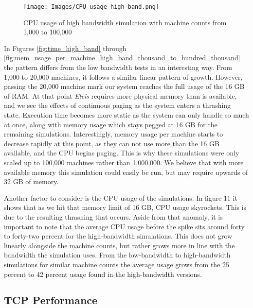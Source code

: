 \documentclass[journal]{IEEEtran} %
\newcommand{\imagewidth}{0.45\textwidth}
\newcommand{\elvis}{\textit{Elvis}}
\begin{document}
\begin{figure}[H]
    \centerline{\texttt{[image: Images/CPU\_usage\_high\_band.png]}}
    \caption{CPU usage of high bandwidth simulation with machine counts from 1,000 to 100,000}
    \label{fig:CPU_usage_high_band}
\end{figure}
In Figures \ref{fig:time_high_band} through \ref{fig:mem_usage_per_machine_high_band_thousand_to_hundred_thousand} the pattern differs from the low bandwidth tests in an interesting way. From 1,000 to 20,000 machines, it follows a similar linear pattern of growth. However, passing the 20,000 machine mark our system reaches the full usage of the 16 GB of RAM. At that point \elvis{} requires more physical memory than is available, and we see the effects of continuous paging as the system enters a thrashing state. Execution time becomes more static as the system can only handle so much at once, along with memory usage which stays pegged at 16 GB for the remaining simulations. Interestingly, memory usage per machine starts to decrease rapidly at this point, as they can not use more than the 16 GB available, and the CPU begins paging. This is why these simulations were only scaled up to 100,000 machines rather than 1,000,000. We believe that with more available memory this simulation could easily be run, but may require upwards of 32 GB of memory.

Another factor to consider is the CPU usage of the simulations. In figure 11 it shows that as we hit that memory limit of 16 GB, CPU usage skyrockets. This is due to the resulting thrashing that occurs. Aside from that anomaly, it is important to note that the average CPU usage before the spike sits around forty to forty-two percent for the high-bandwidth simulations. This does not grow linearly alongside the machine counts, but rather grows more in line with the bandwidth the simulation uses. From the low-bandwidth to high-bandwidth simulations for similar machine counts the average usage grows from the 25 percent to 42 percent usage found in the high-bandwidth versions.


\subsection{TCP Performance}
\end{document}
